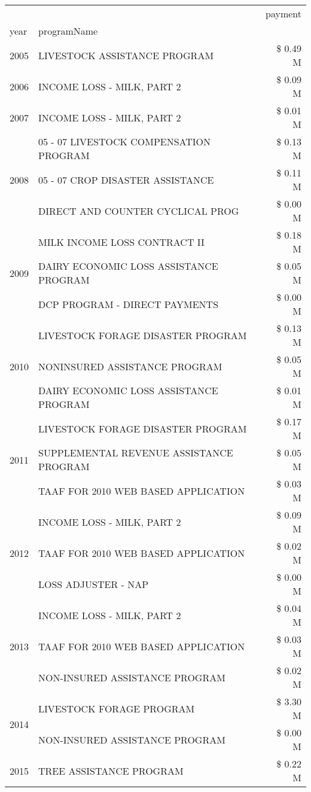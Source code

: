 \begin{tabular}{llr}
\toprule
 &  & payment \\
year & programName &  \\
\midrule
2005 & LIVESTOCK ASSISTANCE PROGRAM & \$ 0.49 M \\
\cline{1-3}
2006 & INCOME LOSS - MILK, PART 2 & \$ 0.09 M \\
\cline{1-3}
2007 & INCOME LOSS - MILK, PART 2 & \$ 0.01 M \\
\cline{1-3}
\multirow[t]{3}{*}{2008} & 05 - 07 LIVESTOCK COMPENSATION PROGRAM & \$ 0.13 M \\
 & 05 - 07 CROP DISASTER ASSISTANCE & \$ 0.11 M \\
 & DIRECT AND COUNTER CYCLICAL PROG & \$ 0.00 M \\
\cline{1-3}
\multirow[t]{3}{*}{2009} & MILK INCOME LOSS CONTRACT II & \$ 0.18 M \\
 & DAIRY ECONOMIC LOSS ASSISTANCE PROGRAM & \$ 0.05 M \\
 & DCP PROGRAM - DIRECT PAYMENTS & \$ 0.00 M \\
\cline{1-3}
\multirow[t]{3}{*}{2010} & LIVESTOCK FORAGE DISASTER PROGRAM & \$ 0.13 M \\
 & NONINSURED ASSISTANCE PROGRAM & \$ 0.05 M \\
 & DAIRY ECONOMIC LOSS ASSISTANCE PROGRAM & \$ 0.01 M \\
\cline{1-3}
\multirow[t]{3}{*}{2011} & LIVESTOCK FORAGE DISASTER PROGRAM & \$ 0.17 M \\
 & SUPPLEMENTAL REVENUE ASSISTANCE PROGRAM & \$ 0.05 M \\
 & TAAF FOR 2010 WEB BASED APPLICATION & \$ 0.03 M \\
\cline{1-3}
\multirow[t]{3}{*}{2012} & INCOME LOSS - MILK, PART 2 & \$ 0.09 M \\
 & TAAF FOR 2010 WEB BASED APPLICATION & \$ 0.02 M \\
 & LOSS ADJUSTER - NAP & \$ 0.00 M \\
\cline{1-3}
\multirow[t]{3}{*}{2013} & INCOME LOSS - MILK, PART 2 & \$ 0.04 M \\
 & TAAF FOR 2010 WEB BASED APPLICATION & \$ 0.03 M \\
 & NON-INSURED ASSISTANCE PROGRAM & \$ 0.02 M \\
\cline{1-3}
\multirow[t]{2}{*}{2014} & LIVESTOCK FORAGE PROGRAM & \$ 3.30 M \\
 & NON-INSURED ASSISTANCE PROGRAM & \$ 0.00 M \\
\cline{1-3}
\multirow[t]{3}{*}{2015} & TREE ASSISTANCE PROGRAM & \$ 0.22 M \\

\end{tabular}

